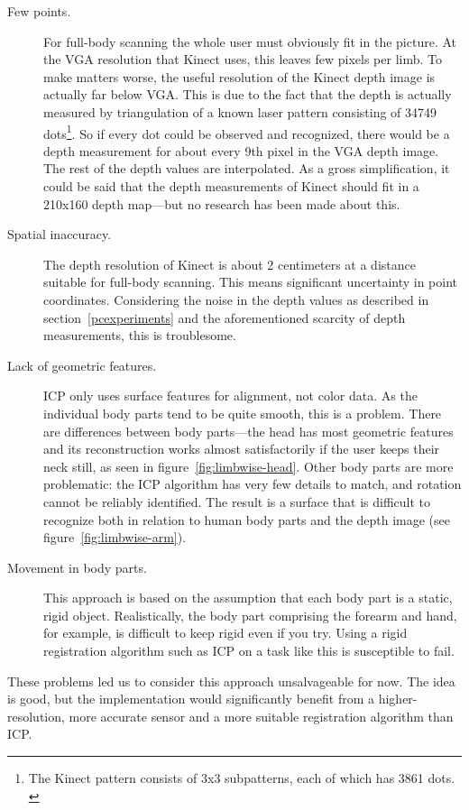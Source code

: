 \begin{description}
    \item[Few points.] For full-body scanning the whole user must obviously fit in the picture. At the VGA resolution that Kinect uses, this leaves few pixels per limb. To make matters worse, the useful resolution of the Kinect depth image is actually far below VGA. This is due to the fact that the depth is actually measured by triangulation of a known laser pattern consisting of 34749 dots\footnote{The Kinect pattern consists of 3x3 subpatterns, each of which has 3861 dots. \citep{reichinger2011}}. So if every dot could be observed and recognized, there would be a depth measurement for about every 9th pixel in the VGA depth image. The rest of the depth values are interpolated. As a gross simplification, it could be said that the depth measurements of Kinect should fit in a 210x160 depth map---but no research has been made about this.
    \item[Spatial inaccuracy.] The depth resolution of Kinect is about 2 centimeters at a distance suitable for full-body scanning. This means significant uncertainty in point coordinates. Considering the noise in the depth values as described in section~\ref{pcexperiments} and the aforementioned scarcity of depth measurements, this is troublesome.
    \item[Lack of geometric features.] ICP only uses surface features for alignment, not color data. As the individual body parts tend to be quite smooth, this is a problem. There are differences between body parts---the head has most geometric features and its reconstruction works almost satisfactorily if the user keeps their neck still, as seen in figure~\ref{fig:limbwise-head}. Other body parts are more problematic: the ICP algorithm has very few details to match, and rotation cannot be reliably identified. The result is a surface that is difficult to recognize both in relation to human body parts and the depth image (see figure~\ref{fig:limbwise-arm}).
    \item[Movement in body parts.] This approach is based on the assumption that each body part is a static, rigid object. Realistically, the body part comprising the forearm and hand, for example, is difficult to keep rigid even if you try. Using a rigid registration algorithm such as ICP on a task like this is susceptible to fail.
\end{description}

These problems led us to consider this approach unsalvageable for now. The idea is good, but the implementation would significantly benefit from a higher-resolution, more accurate sensor and a more suitable registration algorithm than ICP.

